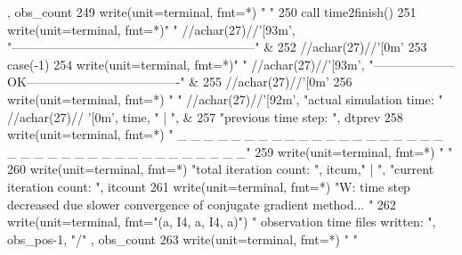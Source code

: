 \begin{DoxyCode}
{      , obs\_count}
249 \textcolor{comment}{          }\textcolor{keyword}{write}(unit=terminal, fmt=*) \textcolor{stringliteral}{"  "}
250           \textcolor{keyword}{call }time2finish()
251           \textcolor{keyword}{write}(unit=terminal, fmt=*)\textcolor{stringliteral}{" "} //achar(27)//\textcolor{stringliteral}{'[93m'},  \textcolor{stringliteral}{
      "-----------------------------------------------------------"}\textcolor{comment}{ &}
252 \textcolor{comment}{                                          //achar(27)//}\textcolor{stringliteral}{'[0m'}
253         \textcolor{keywordflow}{case}(-1)
254           \textcolor{keyword}{write}(unit=terminal, fmt=*)\textcolor{stringliteral}{" "} //achar(27)//\textcolor{stringliteral}{'[93m'},  \textcolor{stringliteral}{
      "--------------------OK-------------------------------------"}\textcolor{comment}{ &}
255 \textcolor{comment}{                                          //achar(27)//}\textcolor{stringliteral}{'[0m'}
256           \textcolor{keyword}{write}(unit=terminal, fmt=*) \textcolor{stringliteral}{" "} //achar(27)//\textcolor{stringliteral}{'[92m'}, \textcolor{stringliteral}{"actual simulation time: "}\textcolor{comment}{ //achar(27)//}\textcolor{stringliteral}{
      '[0m'}\textcolor{comment}{, time, }\textcolor{stringliteral}{"  | "}\textcolor{comment}{, &}
257 \textcolor{comment}{                                      }\textcolor{stringliteral}{"previous time step: "}, dtprev
258           \textcolor{keyword}{write}(unit=terminal, fmt=*) \textcolor{stringliteral}{"       \_ \_ \_ \_ \_ \_ \_ \_ \_ \_ \_ \_ \_ \_ \_ \_ \_ \_ \_ \_ \_ \_ \_ \_ \_ \_ \_ \_ \_ \_ \_
       \_ \_ \_ \_ \_ \_ \_"}
259           \textcolor{keyword}{write}(unit=terminal, fmt=*) \textcolor{stringliteral}{"  "}
260           \textcolor{keyword}{write}(unit=terminal, fmt=*) \textcolor{stringliteral}{"total iteration count: "}, itcum,\textcolor{stringliteral}{"         | "}\textcolor{comment}{, }\textcolor{stringliteral}{"current iteration
       count: "}\textcolor{comment}{, itcount}
261 \textcolor{comment}{          }\textcolor{keyword}{write}(unit=terminal, fmt=*) \textcolor{stringliteral}{"W: time step decreased due slower convergence of conjugate gradient
       method...  "}
262           \textcolor{keyword}{write}(unit=terminal, fmt=\textcolor{stringliteral}{"(a, I4, a, I4, a)"}) \textcolor{stringliteral}{" observation time files written: "}\textcolor{comment}{, obs\_pos-1, }\textcolor{stringliteral}{"/"}\textcolor{comment}{
      , obs\_count}
263 \textcolor{comment}{          }\textcolor{keyword}{write}(unit=terminal, fmt=*) \textcolor{stringliteral}{"  "}

\end{DoxyCode}
